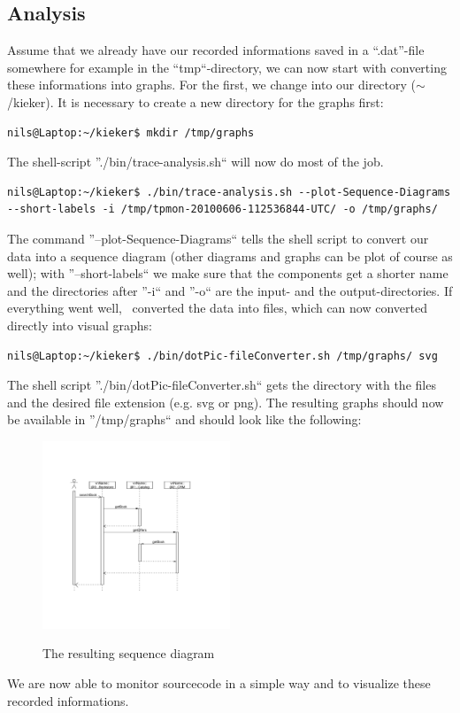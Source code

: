 \documentclass[a4paper, oneside, 11pt]{scrartcl}
\begin{document}
    \subsection{Analysis}
      Assume that we already have our recorded informations saved in a ``.dat''-file somewhere for example in the ``tmp``-directory, we can now start with converting these informations into graphs. For the first, we change into our \Kieker\-directory ($\sim$/kieker). It is necessary to create a new directory for the graphs first:
\begin{lstlisting}
nils@Laptop:~/kieker$ mkdir /tmp/graphs
\end{lstlisting}
The shell-script ''./bin/trace-analysis.sh`` will now do most of the job.
\begin{lstlisting}
nils@Laptop:~/kieker$ ./bin/trace-analysis.sh --plot-Sequence-Diagrams --short-labels -i /tmp/tpmon-20100606-112536844-UTC/ -o /tmp/graphs/
\end{lstlisting}
The command ''--plot-Sequence-Diagrams`` tells the shell script to convert our data into a sequence diagram (other diagrams and graphs can be plot of course as well); with ''--short-labels`` we make sure that the components get a shorter name and the directories after ''-i`` and ''-o`` are the input- and the output-directories. If everything went well, \Kieker\ converted the data into files, which can now converted directly into visual graphs:
\begin{lstlisting}
nils@Laptop:~/kieker$ ./bin/dotPic-fileConverter.sh /tmp/graphs/ svg
\end{lstlisting}
The shell script ''./bin/dotPic-fileConverter.sh`` gets the directory with the files and the desired file extension (e.g. svg or png). The resulting graphs should now be available in ''/tmp/graphs`` and should look like the following:
\begin{figure}[H]
  \begin{center}
    \includegraphics[width=0.5\textwidth]{sequenceDiagram.pdf}
    \label{image:sequencediagram}
    \caption{The resulting sequence diagram}
  \end{center}
\end{figure}
We are now able to monitor sourcecode in a simple way and to visualize these recorded informations.
\end{document}
